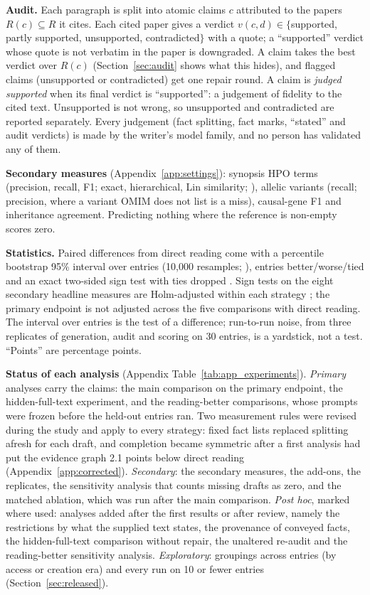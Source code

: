 \documentclass{article} %
\begin{document}
\textbf{Audit.} Each paragraph is split into atomic claims $c$ attributed to the papers $R(c)\subseteq R$ it cites. Each cited paper gives a verdict $v(c,d)\in\{$supported, partly supported, unsupported, contradicted$\}$ with a quote; a ``supported'' verdict whose quote is not verbatim in the paper is downgraded. A claim takes the best verdict over $R(c)$ (Section~\ref{sec:audit} shows what this hides), and flagged claims (unsupported or contradicted) get one repair round. A claim is \emph{judged supported} when its final verdict is ``supported'': a judgement of fidelity to the cited text. Unsupported is not wrong, so unsupported and contradicted are reported separately. Every judgement (fact splitting, fact marks, ``stated'' and audit verdicts) is made by the writer's model family, and no person has validated any of them.

\textbf{Secondary measures} (Appendix~\ref{app:settings}): synopsis HPO terms (precision, recall, F1; exact, hierarchical, Lin similarity; \citealp{Khler2009ClinicalDiagnostics,Resnik1995UsingInformation}), allelic variants (recall; precision, where a variant OMIM does not list is a miss), causal-gene F1 and inheritance agreement. Predicting nothing where the reference is non-empty scores zero.

\textbf{Statistics.} Paired differences from direct reading come with a percentile bootstrap 95\% interval over entries (10,000 resamples; \citealp{Efron1979BootstrapMethods}), entries better/worse/tied and an exact two-sided sign test with ties dropped \citep{Dixon1946StatisticalSign}. Sign tests on the eight secondary headline measures are Holm-adjusted within each strategy \citep{holm1979simple}; the primary endpoint is not adjusted across the five comparisons with direct reading. The interval over entries is the test of a difference; run-to-run noise, from three replicates of generation, audit and scoring on 30 entries, is a yardstick, not a test. ``Points'' are percentage points.

\textbf{Status of each analysis} (Appendix Table~\ref{tab:app_experiments}). \emph{Primary} analyses carry the claims: the main comparison on the primary endpoint, the hidden-full-text experiment, and the reading-better comparisons, whose prompts were frozen before the held-out entries ran. Two measurement rules were revised during the study and apply to every strategy: fixed fact lists replaced splitting afresh for each draft, and completion became symmetric after a first analysis had put the evidence graph 2.1 points below direct reading (Appendix~\ref{app:corrected}). \emph{Secondary}: the secondary measures, the add-ons, the replicates, the sensitivity analysis that counts missing drafts as zero, and the matched ablation, which was run after the main comparison. \emph{Post hoc}, marked where used: analyses added after the first results or after review, namely the restrictions by what the supplied text states, the provenance of conveyed facts, the hidden-full-text comparison without repair, the unaltered re-audit and the reading-better sensitivity analysis. \emph{Exploratory}: groupings across entries (by access or creation era) and every run on 10 or fewer entries (Section~\ref{sec:released}).
\end{document}

